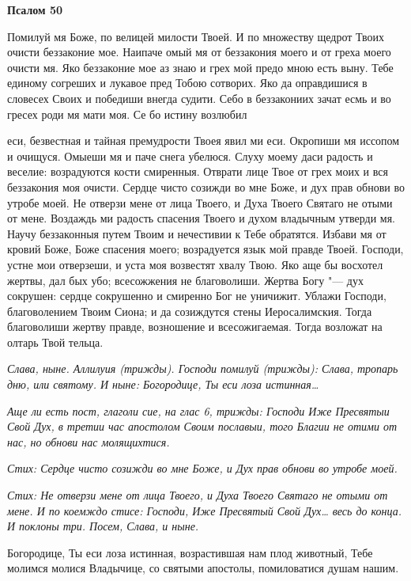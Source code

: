  

\bfseries Псалом 50\normalfont{}


   Помилуй мя Боже, по велицей милости Твоей. И по множеству щедрот
Твоих очисти беззаконие мое. Наипаче омый мя от беззакония моего и от
греха моего очисти мя. Яко беззаконие мое аз знаю и грех мой предо мною
есть выну. Тебе единому согреших и лукавое пред Тобою сотворих. Яко да
оправдишися в словесех Своих и победиши внегда судити. Себо в
беззакониих зачат есмь и во гресех роди мя мати моя. Се бо истину возлюбил

еси, безвестная и тайная премудрости Твоея явил ми еси. Окропиши мя
иссопом и очищуся. Омыеши мя и паче снега убелюся. Слуху моему даси
радость и веселие: возрадуются кости смиренныя. Отврати лице Твое от
грех моих и вся беззакония моя очисти. Сердце чисто созижди во
мне Боже, и дух прав обнови во утробе моей. Не отверзи мене от
лица Твоего, и Духа Твоего Святаго не отыми от мене. Воздаждь ми
радость спасения Твоего и духом владычным утверди мя. Научу
беззаконныя путем Твоим и нечестивии к Тебе обратятся. Избави мя от
кровий Боже, Боже спасения моего; возрадуется язык мой правде
Твоей. Господи, устне мои отверзеши, и уста моя возвестят хвалу
Твою. Яко аще бы восхотел жертвы, дал бых убо; всесожжения не
благоволиши. Жертва Богу "--- дух сокрушен: сердце сокрушенно и смиренно
Бог не уничижит. Ублажи Господи, благоволением Твоим Сиона; и
да созиждутся стены Иеросалимския. Тогда благоволиши жертву
правде, возношение и всесожигаемая. Тогда возложат на олтарь Твой
тельца.


 \itshape Слава, ныне\normalfont{}. Аллилуия \itshape (трижды)\normalfont{}. Господи помилуй \itshape (трижды):
Слава, тропарь дню, или святому. И ныне:\normalfont{} Богородице, Ты еси лоза
истинная…


 \itshape Аще ли есть пост, глаголи сие, на глас 6, трижды:\normalfont{} Господи Иже
Пресвятыи Свой Дух, в третии час апостолом Своим пославыи, того Благии
не отими от нас, но обнови нас молящихтися.


 \itshape Стих:\normalfont{} Сердце чисто созижди во мне Боже, и Дух прав обнови во утробе
моей.


 \itshape Стих:\normalfont{} Не отверзи мене от лица Твоего, и Духа Твоего Святаго не отыми
от мене. \itshape И по коемждо стисе:\normalfont{} Господи, Иже Пресвятый Свой Дух… \itshape весь до
конца. И поклоны три. Посем,\normalfont{} \itshape Слава, и ныне.\normalfont{}


   Богородице, Ты еси лоза истинная, возрастившая нам плод животный,
Тебе молимся молися Владычице, со святыми апостолы, помиловатися
душам нашим.


